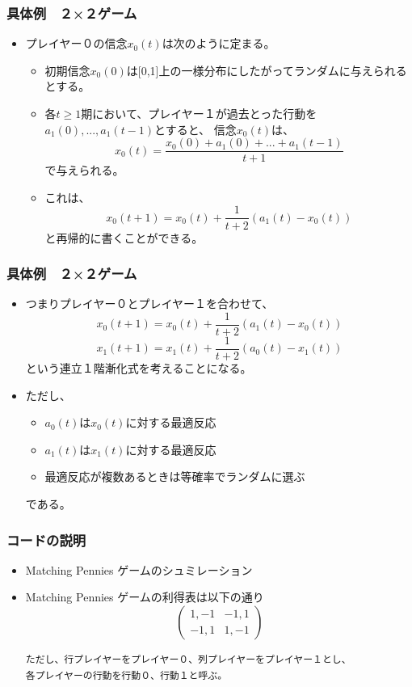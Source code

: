 \documentclass[dvipdfmx,fleqn,handout]{beamer}
\begin{document}
\begin{frame}
\frametitle{具体例　２×２ゲーム}
\begin{itemize}\setlength{\parskip}{0.5em}
\item
プレイヤー０の信念$x_0(t)$は次のように定まる。
 \begin{itemize}\setlength{\parskip}{0.5em}
 \item
 初期信念$x_0(0)$は[0,1]上の一様分布にしたがってランダムに与えられるとする。
 \item
 各$t\geq1$期において、プレイヤー１が過去とった行動を$a_1(0),...,a_1(t-1)$とすると、
 信念$x_0(t)$は、
 \[
 x_0(t)
 = \frac{x_0(0)+a_1(0)+...+a_1(t-1)}{t+1} 
 \]
 で与えられる。
 \item
 これは、
 \[
 x_0(t+1)
 = x_0(t) + \frac{1}{t+2} (a_1(t) - x_0(t))
 \]
 と再帰的に書くことができる。
 \end{itemize}
\end{itemize}
\end{frame}

\begin{frame}
\frametitle{具体例　２×２ゲーム}
\begin{itemize}\setlength{\parskip}{0.5em}
\item
つまりプレイヤー０とプレイヤー１を合わせて、
\[
x_0(t+1)
= x_0(t) + \frac{1}{t+2} (a_1(t) - x_0(t))
\]
\[
x_1(t+1)
= x_1(t) + \frac{1}{t+2} (a_0(t) - x_1(t))
\]
という連立１階漸化式を考えることになる。
\item
ただし、
 \begin{itemize}\setlength{\parskip}{0.5em}
 \item
 $a_0(t)$は$x_0(t)$に対する最適反応
 \item
 $a_1(t)$は$x_1(t)$に対する最適反応
 \item
 最適反応が複数あるときは等確率でランダムに選ぶ
 \end{itemize}
である。
\end{itemize}
\end{frame}

\begin{frame}[containsverbatim]
\frametitle{コードの説明}
\begin{itemize}\setlength{\parskip}{0.5em}
\item
Matching Pennies ゲームのシュミレーション
\item
Matching Pennies ゲームの利得表は以下の通り
\texttt{}
\[
\begin{pmatrix}
  1,-1&-1,1\\
  -1,1&1,-1
\end{pmatrix}
\]
\begin{verbatim}
ただし、行プレイヤーをプレイヤー０、列プレイヤーをプレイヤー１とし、
各プレイヤーの行動を行動０、行動１と呼ぶ。
\end{verbatim}
\end{itemize}
\end{frame}
\end{document}

